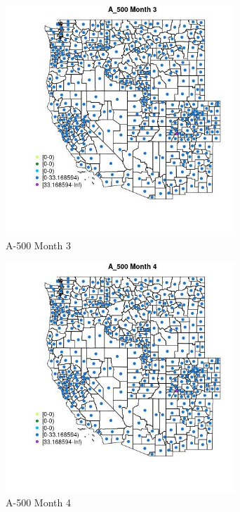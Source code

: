 \begin{figure} 
\centering  
\includegraphics[width=0.77\textwidth]{Code_Outputs/df_report_ML_predictors_CountyCentroid_Locations_Dates_2008-01-01to2018-12-31_MapObsMo3A_500.jpg} 
\caption{\label{fig:df_report_ML_predictors_CountyCentroid_Locations_Dates_2008-01-01to2018-12-31MapObsMo3A_500}A-500 Month 3} 
\end{figure} 
 

\begin{figure} 
\centering  
\includegraphics[width=0.77\textwidth]{Code_Outputs/df_report_ML_predictors_CountyCentroid_Locations_Dates_2008-01-01to2018-12-31_MapObsMo4A_500.jpg} 
\caption{\label{fig:df_report_ML_predictors_CountyCentroid_Locations_Dates_2008-01-01to2018-12-31MapObsMo4A_500}A-500 Month 4} 
\end{figure} 
 

